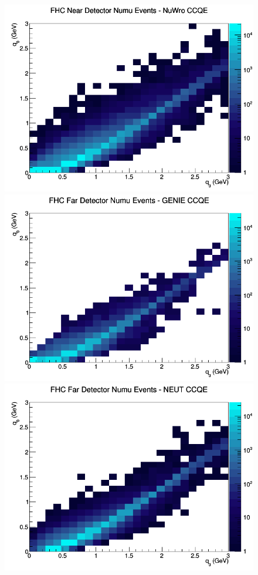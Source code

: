 \documentclass[12pt]{article}
\begin{document}
\begin{figure}[h]
\includegraphics[width=\linewidth]{eff_q0_q3/GAr/CCQE_FHC_ND_numu_q3_q0_NuWro.png}
\endminipage
\newline
{}
\includegraphics[width=\linewidth]{eff_q0_q3/GAr/CCQE_FHC_FD_numu_q3_q0_GENIE.png}
\endminipage
{}
\includegraphics[width=\linewidth]{eff_q0_q3/GAr/CCQE_FHC_FD_numu_q3_q0_NEUT.png}

\end{figure}
\end{document}
